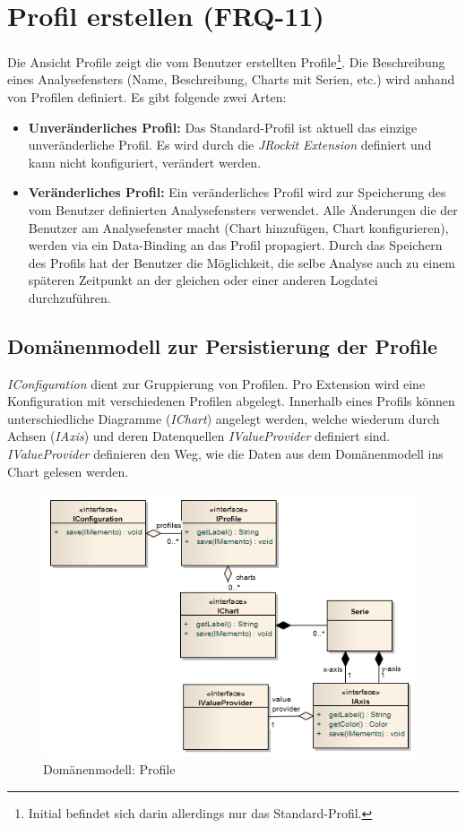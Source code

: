 \section{Profil erstellen (FRQ-11)}
Die Ansicht Profile zeigt die vom Benutzer erstellten Profile\footnote{Initial befindet sich darin allerdings nur das Standard-Profil.}. Die Beschreibung eines Analysefensters (Name, Beschreibung, Charts mit Serien, etc.) wird anhand von Profilen definiert. Es gibt folgende zwei Arten:
\begin{itemize}
	\item \textbf{Unveränderliches Profil:} Das Standard-Profil ist aktuell das einzige unveränderliche Profil. Es wird durch die \textit{JRockit Extension} definiert und kann nicht konfiguriert, verändert werden.
	\item \textbf{Veränderliches Profil:} Ein veränderliches Profil wird zur Speicherung des vom Benutzer definierten Analysefensters verwendet. Alle Änderungen die der Benutzer am Analysefenster macht (Chart hinzufügen, Chart konfigurieren), werden via ein Data-Binding an das Profil propagiert. Durch das Speichern des Profils hat der Benutzer die Möglichkeit, die selbe Analyse auch zu einem späteren Zeitpunkt an der gleichen oder einer anderen Logdatei durchzuführen.
\end{itemize}

\subsection{Domänenmodell zur Persistierung der Profile}
\textit{IConfiguration} dient zur Gruppierung von Profilen. Pro Extension wird eine Konfiguration mit verschiedenen Profilen abgelegt. Innerhalb eines Profils können unterschiedliche Diagramme (\textit{IChart}) angelegt werden, welche wiederum durch Achsen (\textit{IAxis}) und deren Datenquellen \textit{IValueProvider} definiert sind. \textit{IValueProvider} definieren den Weg, wie die Daten aus dem Domänenmodell ins Chart gelesen werden.
 \begin{figure}[H]
  	\centering
    	\includegraphics[width=11cm]{images/core_domain_profiles}
        	\caption{Domänenmodell: Profile}
\end{figure}

